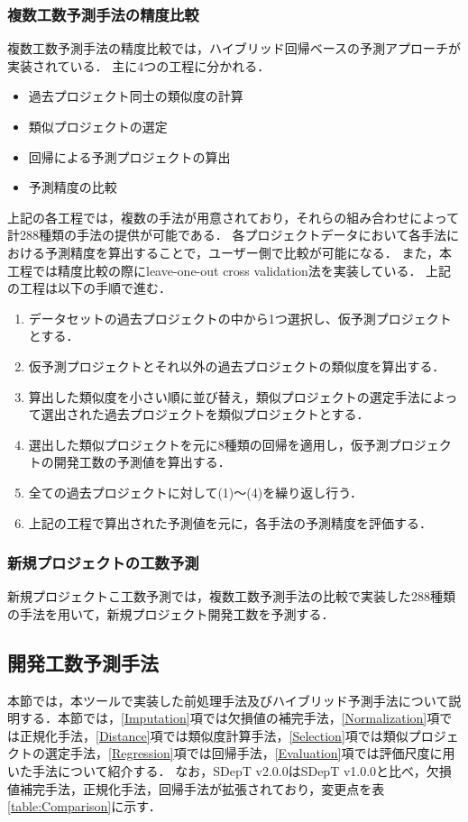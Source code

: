 \subsubsection{複数工数予測手法の精度比較}\label{PastPrediction}
複数工数予測手法の精度比較では，ハイブリッド回帰ベースの予測アプローチ\cite{Hybrid}が実装されている．
主に4つの工程に分かれる．
\begin{itemize}
  \item 過去プロジェクト同士の類似度の計算
  \item 類似プロジェクトの選定
  \item 回帰による予測プロジェクトの算出
  \item 予測精度の比較
\end{itemize}
上記の各工程では，複数の手法が用意されており，それらの組み合わせによって計288種類の手法の提供が可能である．
各プロジェクトデータにおいて各手法における予測精度を算出することで，ユーザー側で比較が可能になる．
また，本工程では精度比較の際にleave-one-out cross validation法\cite{Kohavi1995}を実装している．
上記の工程は以下の手順で進む．
\begin{enumerate}[label=(\arabic*)]
  \item データセットの過去プロジェクトの中から1つ選択し、仮予測プロジェクトとする．
  \item 仮予測プロジェクトとそれ以外の過去プロジェクトの類似度を算出する．
  \item 算出した類似度を小さい順に並び替え，類似プロジェクトの選定手法によって選出された過去プロジェクトを類似プロジェクトとする．
  \item 選出した類似プロジェクトを元に8種類の回帰を適用し，仮予測プロジェクトの開発工数の予測値を算出する．
  \item 全ての過去プロジェクトに対して(1)～(4)を繰り返し行う．
  \item 上記の工程で算出された予測値を元に，各手法の予測精度を評価する．
\end{enumerate}
\subsubsection{新規プロジェクトの工数予測}\label{NewPrediction}
新規プロジェクトこ工数予測では，複数工数予測手法の比較で実装した288種類の手法を用いて，新規プロジェクト開発工数を予測する．

\clearpage
\subsection{開発工数予測手法}\label{subsec:3.3}

本節では，本ツールで実装した前処理手法及びハイブリッド予測手法\cite{Hybrid}について説明する．本節では，\ref{Imputation}項では欠損値の補完手法，\ref{Normalization}項では正規化手法，\ref{Distance}項では類似度計算手法，\ref{Selection}項では類似プロジェクトの選定手法，\ref{Regression}項では回帰手法，\ref{Evaluation}項では評価尺度に用いた手法について紹介する．
なお，SDepT v2.0.0はSDepT v1.0.0と比べ，欠損値補完手法，正規化手法，回帰手法が拡張されており，変更点を表\ref{table:Comparison}に示す．

